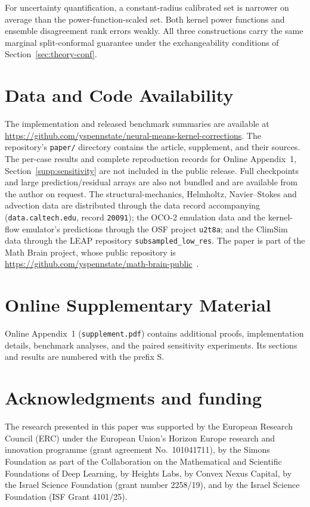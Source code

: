\documentclass[twoside,11pt]{article}
\begin{document}
For uncertainty quantification, a constant-radius calibrated set is narrower on average than the power-function-scaled set. Both kernel power functions and ensemble disagreement rank errors weakly. All three constructions carry the same marginal split-conformal guarantee under the exchangeability conditions of Section~\ref{sec:theory-conf}.



\section{Data and Code Availability}
The implementation and released benchmark summaries are available at
\url{https://github.com/yspennstate/neural-means-kernel-corrections}.
The repository's \texttt{paper/} directory contains the article, supplement,
and their sources. The per-case results and complete reproduction
records for Online Appendix~1, Section~\ref{supp:sensitivity} are not included in the public
release. Full checkpoints and large prediction/residual arrays are also not
bundled and are available from the author on request. The
structural-mechanics, Helmholtz, Navier--Stokes and advection data are
distributed through the data record accompanying \citet{dehoop2022cost}
(\texttt{data.caltech.edu}, record \texttt{20091}); the OCO-2 emulation data
and the kernel-flow emulator's predictions through the OSF project
\texttt{u2t8a}; and the ClimSim data through the LEAP repository
\texttt{subsampled\_low\_res}. The paper is part of the Math Brain project, whose public repository is \url{https://github.com/yspennstate/math-brain-public}~\citep{MathBrainRepo}.

\section{Online Supplementary Material}
Online Appendix~1 (\texttt{supplement.pdf}) contains additional proofs,
implementation details, benchmark analyses, and the paired sensitivity
experiments. Its sections and results are numbered with the prefix S.

\section*{Acknowledgments and funding}
The research presented in this paper was supported by the European Research
Council (ERC) under the European Union's Horizon Europe research and innovation
programme (grant agreement No.~101041711), by the Simons Foundation as part
of the Collaboration on the Mathematical and Scientific Foundations of Deep
Learning, by Heights Labs, by Convex Nexus Capital, by the Israel Science
Foundation (grant number 2258/19), and by the Israel Science Foundation (ISF
Grant 4101/25).
\end{document}
